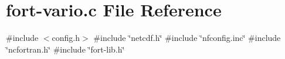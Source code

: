 \hypertarget{fort-vario_8c}{}\section{fort-\/vario.c File Reference}
\label{fort-vario_8c}
{\ttfamily \#include $<$config.\+h$>$}\newline
{\ttfamily \#include \char`\"{}netcdf.\+h\char`\"{}}\newline
{\ttfamily \#include \char`\"{}nfconfig.\+inc\char`\"{}}\newline
{\ttfamily \#include \char`\"{}ncfortran.\+h\char`\"{}}\newline
{\ttfamily \#include \char`\"{}fort-\/lib.\+h\char`\"{}}\newline
